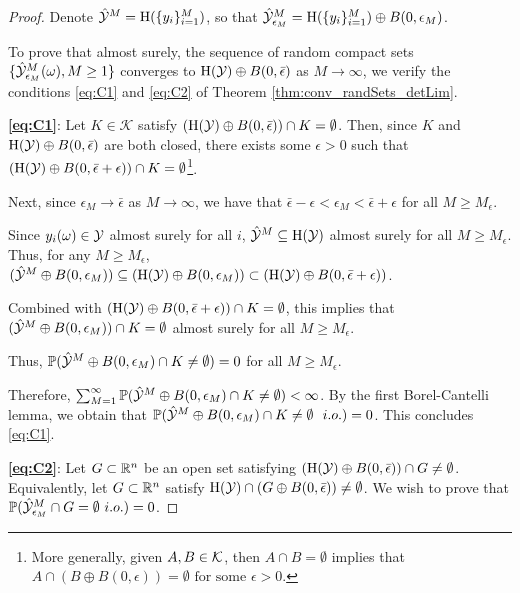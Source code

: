 \documentclass[12pt]{l4dc2022} %
\begin{document}
\begin{proof} 
Denote $\hat{\mathcal{Y}}^M=\textrm{H}(\{y_i\}_{i=1}^M)$, so that  $\hat{\mathcal{Y}}^M_{\epsilon_M}=\textrm{H}(\{y_i\}_{i=1}^M)\oplus B(0,\epsilon_M)$. 

To prove that almost surely, the sequence of random compact sets $\{\hat{\mathcal{Y}}^M_{\epsilon_M}(\omega), M\geq 1\}$ converges to $\textrm{H}(\mathcal{Y})\oplus B(0,\bar{\epsilon})$
 as $M\rightarrow\infty$, we verify the conditions \eqref{eq:C1} and \eqref{eq:C2} of Theorem \ref{thm:conv_randSets_detLim}. 

% 
% 
% 
% 
	
\vspace{2mm}

% 
\textbf{\eqref{eq:C1}}: Let $K\in \mathcal{K}$ satisfy $(\textrm{H}(\mathcal{Y})\oplus B(0,\bar{\epsilon}))\cap K = \emptyset$. 
Then, %
% 
% 
since $K$ and $\textrm{H}(\mathcal{Y})\oplus B(0,\bar{\epsilon})$ are both closed, there exists some $\epsilon>0$ such that $(\textrm{H}(\mathcal{Y})\oplus B(0,\bar{\epsilon}+\epsilon))\cap K = \emptyset$\footnote{More generally, given $A,B\in\mathcal{K}$, then  
$A\cap B=\emptyset$ implies that $A\cap(B\oplus B(0,\epsilon))=\emptyset \text{ for some $\epsilon>0$.}$}. 
 
 Next, since $\epsilon_M\rightarrow\bar{\epsilon}$ as $M\rightarrow\infty$, we have that $\bar{\epsilon}-\epsilon<\epsilon_M<\bar{\epsilon}+\epsilon$ for all $M\geq M_{\epsilon}$. 
 
Since $y_i(\omega)\in\mathcal{Y}$ almost surely for all $i$, $\hat{\mathcal{Y}}^M\subseteq\textrm{H}(\mathcal{Y})$ almost surely for all $M\geq M_{\epsilon}$. 
Thus, for any $M\geq M_{\epsilon}$, 
$(\hat{\mathcal{Y}}^M\oplus B(0,\epsilon_M))
\subseteq
(\textrm{H}(\mathcal{Y})\oplus B(0,\epsilon_M))
\subset
(\textrm{H}(\mathcal{Y})\oplus B(0,\bar{\epsilon}+\epsilon))$. 

Combined with $(\textrm{H}(\mathcal{Y})\oplus B(0,\bar{\epsilon}+\epsilon))\cap K = \emptyset$, this implies that $(\hat{\mathcal{Y}}^M\oplus B(0,\epsilon_M))\cap K=\emptyset$ almost surely for all $M\geq M_{\epsilon}$. 
	
	Thus, $\mathbb{P}(\hat{\mathcal{Y}}^M\oplus B(0,\epsilon_M)\cap K\neq\emptyset)=0$ for all $M\geq M_{\epsilon}$. 
	
	Therefore, $\sum_{M=1}^\infty \mathbb{P}(\hat{\mathcal{Y}}^M\oplus B(0,\epsilon_M)\cap K\neq\emptyset)<\infty$. By the first Borel-Cantelli lemma, we obtain that $\mathbb{P}(\hat{\mathcal{Y}}^M\oplus B(0,\epsilon_M)\cap K \neq \emptyset \ \ i.o.) = 0$. This concludes \eqref{eq:C1}. 
	
\vspace{2mm}
	
% 
\textbf{\eqref{eq:C2}}: Let $G\subset\mathbb{R}^n$ be an open set satisfying $(\textrm{H}(\mathcal{Y})\oplus B(0,\bar{\epsilon}))\cap G \neq \emptyset$. Equivalently, let $G\subset\mathbb{R}^n$ satisfy $\textrm{H}(\mathcal{Y})\cap (G \oplus B(0,\bar{\epsilon}))\neq \emptyset$. We wish to prove that $\Prob(\hat\Y^M_{\epsilon_M}\cap G  = \emptyset \ i.o.) = 0$. 



\end{proof}
\end{document}
